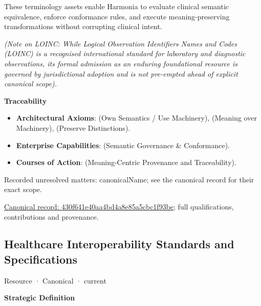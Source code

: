 These terminology assets enable Harmonia to evaluate clinical semantic equivalence, enforce conformance rules, and execute meaning-preserving transformations without corrupting clinical intent.



\emph{(Note on LOINC: While Logical Observation Identifiers Names and Codes (LOINC) is a recognised international standard for laboratory and diagnostic observations, its formal admission as an enduring foundational resource is governed by jurisdictional adoption and is not pre-empted ahead of explicit canonical scope).}



\par\medskip\textbf{Traceability}\par


\begin{itemize}


\item \textbf{Architectural Axioms}: \texttt{} (Own Semantics / Use Machinery), \texttt{} (Meaning over Machinery), \texttt{} (Preserve Distinctions).

\item \textbf{Enterprise Capabilities}: \texttt{} (Semantic Governance \& Conformance).

\item \textbf{Courses of Action}: \texttt{} (Meaning-Centric Provenance and Traceability).

\end{itemize}

{\small Recorded unresolved matters: canonicalName; see the canonical record for their exact scope.}\par
{\footnotesize \href{../../../../continuum/strategy/resource/430f641e40aa4bd4a8e85a5cbc1f93be.md}{Canonical record: 430f641e40aa4bd4a8e85a5cbc1f93be}; full qualifications, contributions and provenance.}\par
\subsection{Healthcare Interoperability Standards and Specifications}

\label{element:4d725c804fb34dfa90486b21118bab8e}
{\small Resource · Canonical · current}\par

\par\medskip\textbf{Strategic Definition}\par


